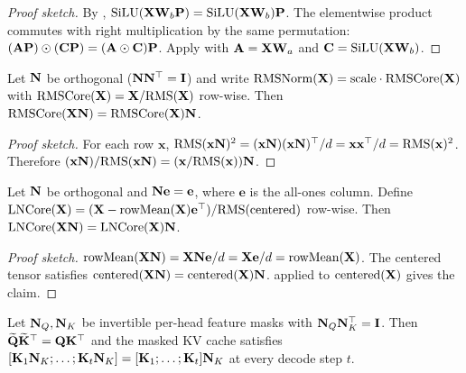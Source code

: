 \begin{proof}[Proof sketch]
By , $\mathrm{SiLU}(\mathbf{X}\mathbf{W}_b\mathbf{P}) = \mathrm{SiLU}(\mathbf{X}\mathbf{W}_b)\mathbf{P}$. The elementwise product commutes with right multiplication by the same permutation: $(\mathbf{A}\mathbf{P})\odot(\mathbf{C}\mathbf{P}) = (\mathbf{A}\odot\mathbf{C})\mathbf{P}$. Apply with $\mathbf{A} = \mathbf{X}\mathbf{W}_a$ and $\mathbf{C} = \mathrm{SiLU}(\mathbf{X}\mathbf{W}_b)$.
\end{proof}

\begin{theorem}
\label{thm:rmsnorm}
Let $\mathbf{N}$ be orthogonal ($\mathbf{N}\mathbf{N}^{\top} = \mathbf{I}$) and write $\mathrm{RMSNorm}(\mathbf{X}) = \mathrm{scale}\cdot \mathrm{RMSCore}(\mathbf{X})$ with $\mathrm{RMSCore}(\mathbf{X}) = \mathbf{X}/\mathrm{RMS}(\mathbf{X})$ row-wise. Then $\mathrm{RMSCore}(\mathbf{X}\mathbf{N}) = \mathrm{RMSCore}(\mathbf{X})\mathbf{N}$.
\end{theorem}

\begin{proof}[Proof sketch]
For each row $\mathbf{x}$, $\mathrm{RMS}(\mathbf{x}\mathbf{N})^2 = (\mathbf{x}\mathbf{N})(\mathbf{x}\mathbf{N})^{\top}/d = \mathbf{x}\mathbf{x}^{\top}/d = \mathrm{RMS}(\mathbf{x})^2$. Therefore $(\mathbf{x}\mathbf{N})/\mathrm{RMS}(\mathbf{x}\mathbf{N}) = (\mathbf{x}/\mathrm{RMS}(\mathbf{x}))\mathbf{N}$.
\end{proof}

\begin{theorem}
\label{thm:layernorm}
Let $\mathbf{N}$ be orthogonal and $\mathbf{N}\mathbf{e} = \mathbf{e}$, where $\mathbf{e}$ is the all-ones column. Define $\mathrm{LNCore}(\mathbf{X}) = (\mathbf{X} - \mathrm{rowMean}(\mathbf{X})\mathbf{e}^{\top}) / \mathrm{RMS}(\mathrm{centered})$ row-wise. Then $\mathrm{LNCore}(\mathbf{X}\mathbf{N}) = \mathrm{LNCore}(\mathbf{X})\mathbf{N}$.
\end{theorem}

\begin{proof}[Proof sketch]
$\mathrm{rowMean}(\mathbf{X}\mathbf{N}) = \mathbf{X}\mathbf{N}\mathbf{e}/d = \mathbf{X}\mathbf{e}/d = \mathrm{rowMean}(\mathbf{X})$. The centered tensor satisfies $\mathrm{centered}(\mathbf{X}\mathbf{N}) = \mathrm{centered}(\mathbf{X})\mathbf{N}$.  applied to $\mathrm{centered}(\mathbf{X})$ gives the claim.
\end{proof}

\begin{theorem}
\label{thm:attention}
Let $\mathbf{N}_{Q}, \mathbf{N}_{K}$ be invertible per-head feature masks with $\mathbf{N}_{Q}\mathbf{N}_{K}^{\top} = \mathbf{I}$. Then $\widetilde{\mathbf{Q}}\widetilde{\mathbf{K}}^{\top} = \mathbf{Q}\mathbf{K}^{\top}$ and the masked KV cache satisfies $[\mathbf{K}_1\mathbf{N}_{K}; \ldots; \mathbf{K}_t\mathbf{N}_{K}] = [\mathbf{K}_1; \ldots; \mathbf{K}_t]\mathbf{N}_{K}$ at every decode step $t$.
\end{theorem}

